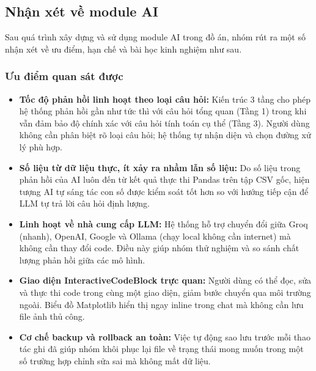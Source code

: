 \subsection{Nhận xét về module AI}
\label{subsec:ai_review}

Sau quá trình xây dựng và sử dụng module AI trong đồ án, nhóm rút ra một số nhận xét về ưu điểm, hạn chế và bài học kinh nghiệm như sau.

\subsubsection{Ưu điểm quan sát được}
\label{subsubsec:ai_pros}

\begin{itemize}
    \item \textbf{Tốc độ phản hồi linh hoạt theo loại câu hỏi:} Kiến trúc 3 tầng cho phép hệ thống phản hồi gần như tức thì với câu hỏi tổng quan (Tầng 1) trong khi vẫn đảm bảo độ chính xác với câu hỏi tính toán cụ thể (Tầng 3). Người dùng không cần phân biệt rõ loại câu hỏi; hệ thống tự nhận diện và chọn đường xử lý phù hợp.

    \item \textbf{Số liệu từ dữ liệu thực, ít xảy ra nhầm lẫn số liệu:} Do số liệu trong phản hồi của AI luôn đến từ kết quả thực thi Pandas trên tập CSV gốc, hiện tượng AI tự sáng tác con số được kiểm soát tốt hơn so với hướng tiếp cận để LLM tự trả lời câu hỏi định lượng.

    \item \textbf{Linh hoạt về nhà cung cấp LLM:} Hệ thống hỗ trợ chuyển đổi giữa Groq (nhanh), OpenAI, Google và Ollama (chạy local không cần internet) mà không cần thay đổi code. Điều này giúp nhóm thử nghiệm và so sánh chất lượng phản hồi giữa các mô hình.

    \item \textbf{Giao diện InteractiveCodeBlock trực quan:} Người dùng có thể đọc, sửa và thực thi code trong cùng một giao diện, giảm bước chuyển qua môi trường ngoài. Biểu đồ Matplotlib hiển thị ngay inline trong chat mà không cần lưu file ảnh thủ công.

    \item \textbf{Cơ chế backup và rollback an toàn:} Việc tự động sao lưu trước mỗi thao tác ghi đã giúp nhóm khôi phục lại file về trạng thái mong muốn trong một số trường hợp chỉnh sửa sai mà không mất dữ liệu.
\end{itemize}

